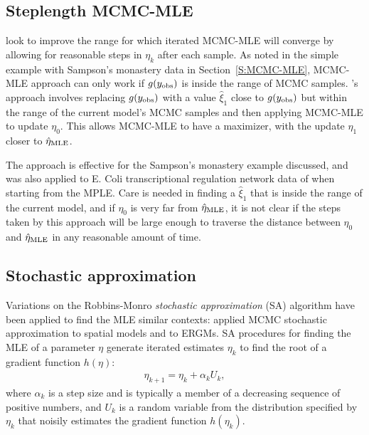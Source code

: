 \subsection{Steplength MCMC-MLE} \label{S:Hummel}
\citet{Hummel} look to improve the range for which iterated MCMC-MLE will converge by
allowing for reasonable steps in $\eta_k$ after each sample.  As noted in the 
simple example with 
Sampson's monastery data in Section~\ref{S:MCMC-MLE}, MCMC-MLE approach can only work 
if $g(y_{\text{obs}})$ is inside the range of MCMC samples.  
\citeauthor{Hummel}'s approach involves 
replacing $g(y_{\text{obs}})$ with a value $\hat{\xi}_1$ close to $g(y_{\text{obs}})$ but within
the range of the current model's MCMC samples
and then applying MCMC-MLE to update $\eta_0$.  This allows MCMC-MLE to have
a maximizer, with the update $\eta_1$ closer to $\hat{\eta}_{\textrm{MLE}}$.

The approach is effective for the Sampson's monastery example discussed, and was also applied
to E. Coli transcriptional regulation network data of \citet{Shen-Orr} when 
starting from the MPLE.  Care is needed in finding a $\hat{\xi}_1$ that is inside
the range of the current model, and if $\eta_0$ is very far from $\hat{\eta}_{\textrm{MLE}}$, it is 
not clear if the steps taken by this approach will be large enough to traverse
the distance between $\eta_0$ and $\hat{\eta}_{\textrm{MLE}}$ in any reasonable amount of time.



%

    

\subsection{Stochastic approximation}

Variations on the Robbins-Monro \emph{stochastic approximation} (SA) algorithm 
\citep{Robbins-Monro} have been applied to find the MLE similar contexts: 
\citet{Younes:1988,Younes:1989,Moyeed:1991,Gu:2001}
applied MCMC stochastic approximation to spatial models and \citet{Snijders:2002} to 
ERGMs.
SA procedures for finding the MLE of a parameter $\eta$ generate iterated estimates 
$\eta_k$ to find the 
root of a gradient function $h(\eta)$:
\begin{align} \label{E:eta SA update}
	\eta_{k+1} = \eta_k + \alpha_k U_k,
\end{align}
where $\alpha_k$ is a step size and is typically a member of a decreasing sequence of 
positive numbers, and $U_k$ is a 
random variable from the distribution specified by $\eta_k$ that noisily estimates the 
gradient function $h(\eta_k)$.  

